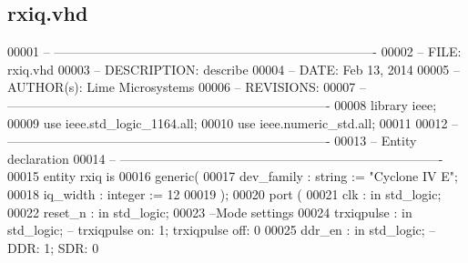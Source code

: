 \subsection{rxiq.\+vhd}
\label{rxiq_8vhd_source}

\begin{DoxyCode}
00001 \textcolor{keyword}{-- ---------------------------------------------------------------------------- }
00002 \textcolor{keyword}{-- FILE:    rxiq.vhd}
00003 \textcolor{keyword}{-- DESCRIPTION: describe}
00004 \textcolor{keyword}{-- DATE:    Feb 13, 2014}
00005 \textcolor{keyword}{-- AUTHOR(s):   Lime Microsystems}
00006 \textcolor{keyword}{-- REVISIONS:}
00007 \textcolor{keyword}{-- ---------------------------------------------------------------------------- }
00008 \textcolor{vhdlkeyword}{library }\textcolor{keywordflow}{ieee};
00009 \textcolor{vhdlkeyword}{use }ieee.std\_logic\_1164.\textcolor{keywordflow}{all};
00010 \textcolor{vhdlkeyword}{use }ieee.numeric\_std.\textcolor{keywordflow}{all};
00011 
00012 \textcolor{keyword}{-- ----------------------------------------------------------------------------}
00013 \textcolor{keyword}{-- Entity declaration}
00014 \textcolor{keyword}{-- ----------------------------------------------------------------------------}
00015 \textcolor{keywordflow}{entity }rxiq \textcolor{keywordflow}{is}
00016    \textcolor{keywordflow}{generic}\textcolor{vhdlchar}{(} 
00017       \textcolor{vhdlchar}{dev_family}    \textcolor{vhdlchar}{:} \textcolor{comment}{string} \textcolor{vhdlchar}{:=} \textcolor{keyword}{"Cyclone IV E"};
00018       \textcolor{vhdlchar}{iq_width}      \textcolor{vhdlchar}{:} \textcolor{comment}{integer} \textcolor{vhdlchar}{:=} \textcolor{vhdllogic}{}\textcolor{vhdllogic}{12}
00019    \textcolor{vhdlchar}{)};
00020    \textcolor{keywordflow}{port} \textcolor{vhdlchar}{(}
00021       \textcolor{vhdlchar}{clk}         \textcolor{vhdlchar}{:} \textcolor{keywordflow}{in} \textcolor{comment}{std\_logic};
00022       \textcolor{vhdlchar}{reset_n}     \textcolor{vhdlchar}{:} \textcolor{keywordflow}{in} \textcolor{comment}{std\_logic};
00023 \textcolor{keyword}{      --Mode settings}
00024       \textcolor{vhdlchar}{trxiqpulse}    \textcolor{vhdlchar}{:} \textcolor{keywordflow}{in} \textcolor{comment}{std\_logic};\textcolor{keyword}{ -- trxiqpulse on: 1; trxiqpulse off: 0}
00025         \textcolor{vhdlchar}{ddr_en}      \textcolor{vhdlchar}{:} \textcolor{keywordflow}{in} \textcolor{comment}{std\_logic};\textcolor{keyword}{ -- DDR: 1; SDR: 0}

\end{DoxyCode}
